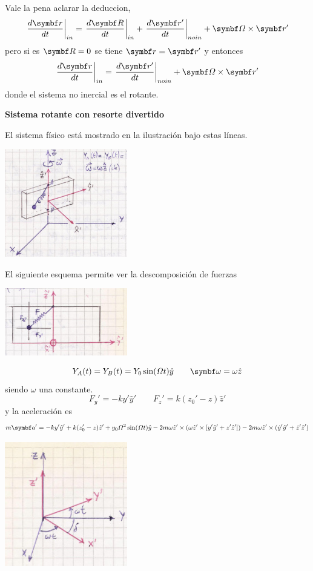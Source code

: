 \documentclass[10pt,oneside]{CBFT_book}
\begin{document}
Vale la pena aclarar la deduccion,
\[
	\left. \dtot{\vb{r}}{t} \right|_{in} = \left. \dtot{\vb{R}}{t} \right|_{in} + \left. \dtot{\vb{r}'}{t} \right|_{no in}
	+ \vb{\Omega} \times \vb{r}' 
\]
pero si es $\vb{R}=0$ se tiene $\vb{r}=\vb{r}'$ y entonces
\[
	\left. \dtot{\vb{r}}{t} \right|_{in} =  \left. \dtot{\vb{r}'}{t} \right|_{no in} + \vb{\Omega} \times \vb{r}' 
\]
donde el sistema no inercial es el rotante.

\begin{ejemplo}{\bf Sistema rotante con resorte divertido}

El sistema físico está mostrado en la ilustración bajo estas líneas.

\includegraphics[width=0.4\textwidth]{images/fig_mc_rotantes_ejemplo_bloque1.jpg}

El siguiente esquema permite ver la descomposición de fuerzas

\includegraphics[width=0.4\textwidth]{images/fig_mc_rotantes_ejemplo_bloque2.jpg}

\[
	Y_A(t) = Y_B(t) = Y_0 \sin (\Omega t) \hat{y} \qquad \vb{\omega} = \omega \hat{z}
\]
siendo $\omega$ una constante.
\[
	F_y' = - k y' \hat{y}' \qquad F_z' = k(z_0' - z) \hat{z}'
\]
y la aceleración es 
\[
	m \vb{a}' = - ky' \hat{y}' + k (z_0' - z) \hat{z}' + y_0 \Omega^2 \sin (\Omega t) \hat{y}
	- 2 m \omega \hat{z}' \times ( \omega \hat{z}' \times [ y' \hat{y}' + z' \hat{z}' ] ) 
	- 2 m \omega \hat{z}' \times ( \dot{y}' \hat{y}' + \dot{z}' \hat{z}' )
\]
 
\includegraphics[width=0.4\textwidth]{images/fig_mc_rotantes_ejemplo_bloque3.jpg}


\end{ejemplo}
\end{document}
